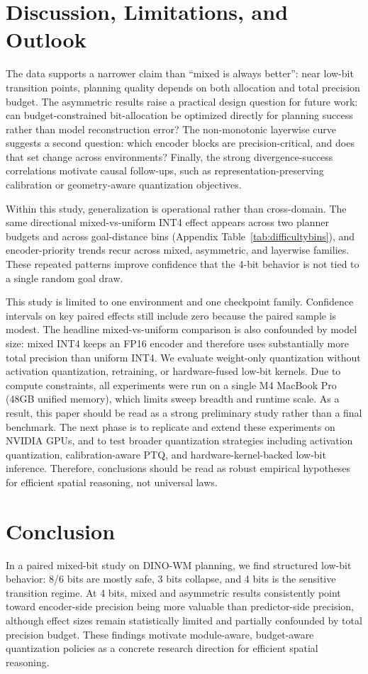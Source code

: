 \documentclass{article}
\begin{document}
\section{Discussion, Limitations, and Outlook}
The data supports a narrower claim than ``mixed is always better'': near low-bit transition points, planning quality depends on both allocation and total precision budget.
The asymmetric results raise a practical design question for future work: can budget-constrained bit-allocation be optimized directly for planning success rather than model reconstruction error?
The non-monotonic layerwise curve suggests a second question: which encoder blocks are precision-critical, and does that set change across environments?
Finally, the strong divergence-success correlations motivate causal follow-ups, such as representation-preserving calibration or geometry-aware quantization objectives.

Within this study, generalization is operational rather than cross-domain.
The same directional mixed-vs-uniform INT4 effect appears across two planner budgets and across goal-distance bins (Appendix Table~\ref{tab:difficultybins}), and encoder-priority trends recur across mixed, asymmetric, and layerwise families.
These repeated patterns improve confidence that the 4-bit behavior is not tied to a single random goal draw.

This study is limited to one environment and one checkpoint family.
Confidence intervals on key paired effects still include zero because the paired sample is modest.
The headline mixed-vs-uniform comparison is also confounded by model size: mixed INT4 keeps an FP16 encoder and therefore uses substantially more total precision than uniform INT4.
We evaluate weight-only quantization without activation quantization, retraining, or hardware-fused low-bit kernels.
Due to compute constraints, all experiments were run on a single M4 MacBook Pro (48GB unified memory), which limits sweep breadth and runtime scale.
As a result, this paper should be read as a strong preliminary study rather than a final benchmark.
The next phase is to replicate and extend these experiments on NVIDIA GPUs, and to test broader quantization strategies including activation quantization, calibration-aware PTQ, and hardware-kernel-backed low-bit inference.
Therefore, conclusions should be read as robust empirical hypotheses for efficient spatial reasoning, not universal laws.

\section{Conclusion}
In a paired mixed-bit study on DINO-WM planning, we find structured low-bit behavior: 8/6 bits are mostly safe, 3 bits collapse, and 4 bits is the sensitive transition regime.
At 4 bits, mixed and asymmetric results consistently point toward encoder-side precision being more valuable than predictor-side precision, although effect sizes remain statistically limited and partially confounded by total precision budget.
These findings motivate module-aware, budget-aware quantization policies as a concrete research direction for efficient spatial reasoning.
\end{document}
